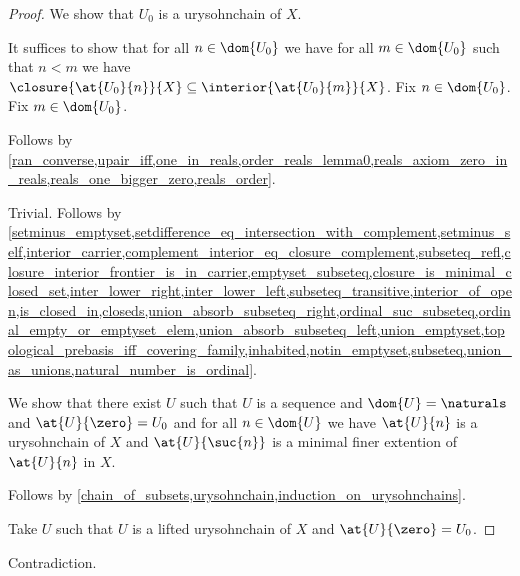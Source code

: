 \begin{proof}
    We show that $U_0$ is a urysohnchain of $X$.
    \begin{subproof}
        It suffices to show that for all $n \in \dom{U_0}$ we have for all $m \in \dom{U_0}$ such that $n < m$ we have $\closure{\at{U_0}{n}}{X} \subseteq \interior{\at{U_0}{m}}{X}$.
        Fix $n \in \dom{U_0}$.
        Fix $m \in \dom{U_0}$.
        \begin{byCase}
                Follows by \cref{ran_converse,upair_iff,one_in_reals,order_reals_lemma0,reals_axiom_zero_in_reals,reals_one_bigger_zero,reals_order}.
                \begin{byCase}
                        Trivial.
                        Follows by \cref{setminus_emptyset,setdifference_eq_intersection_with_complement,setminus_self,interior_carrier,complement_interior_eq_closure_complement,subseteq_refl,closure_interior_frontier_is_in_carrier,emptyset_subseteq,closure_is_minimal_closed_set,inter_lower_right,inter_lower_left,subseteq_transitive,interior_of_open,is_closed_in,closeds,union_absorb_subseteq_right,ordinal_suc_subseteq,ordinal_empty_or_emptyset_elem,union_absorb_subseteq_left,union_emptyset,topological_prebasis_iff_covering_family,inhabited,notin_emptyset,subseteq,union_as_unions,natural_number_is_ordinal}.
                \end{byCase}
        \end{byCase}
    \end{subproof}

    We show that there exist $U$ such that $U$ is a sequence and $\dom{U} = \naturals$ and $\at{U}{\zero} = U_0$ and for all $n \in \dom{U}$ we have $\at{U}{n}$ is a urysohnchain of $X$ and $\at{U}{\suc{n}}$ is a minimal finer extention of $\at{U}{n}$ in $X$.
    \begin{subproof}
        Follows by \cref{chain_of_subsets,urysohnchain,induction_on_urysohnchains}.
    \end{subproof}
    Take $U$ such that $U$ is a lifted urysohnchain of $X$ and $\at{U}{\zero} = U_0$.





    
\end{proof}

\begin{theorem}\label{safe}
    Contradiction.     
\end{theorem}





%
%
%
%
%
%
%
%
%
%

